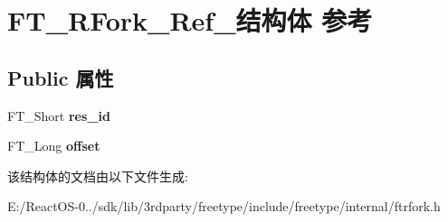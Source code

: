 \hypertarget{struct_f_t___r_fork___ref__}{}\section{F\+T\+\_\+\+R\+Fork\+\_\+\+Ref\+\_\+结构体 参考}
\label{struct_f_t___r_fork___ref__}
\subsection*{Public 属性}
\begin{DoxyCompactItemize}
\item 
\mbox{\label{struct_f_t___r_fork___ref___af685af6f31e938fef5ff75f80662b5c3}} 
F\+T\+\_\+\+Short {\bfseries res\+\_\+id}
\item 
\mbox{\label{struct_f_t___r_fork___ref___a74646e0e8649e3d8af070ddf4362bde8}} 
F\+T\+\_\+\+Long {\bfseries offset}
\end{DoxyCompactItemize}


该结构体的文档由以下文件生成\+:\begin{DoxyCompactItemize}
\item 
E\+:/\+React\+O\+S-\/0../sdk/lib/3rdparty/freetype/include/freetype/internal/ftrfork.\+h\end{DoxyCompactItemize}
